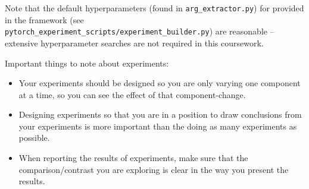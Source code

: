 \documentclass[11pt,]{article}
\begin{document}





Note that the default hyperparameters (found in \texttt{arg\_extractor.py}) for provided in the framework (see\\ \texttt{pytorch\_experiment\_scripts/experiment\_builder.py}) are reasonable -- extensive hyperparameter searches are  not required in this coursework. 

Important things to note about experiments:
\begin{itemize}
    \item Your experiments should be designed so you are only varying one component at a time, so you can see the effect of that component-change.
    \item Designing experiments so that you are in a position to draw conclusions from your experiments is more important than the doing as many experiments as possible.
    \item When reporting the results of experiments, make sure that the comparison/contrast you are exploring is clear in the way you present the results.
\end{itemize}
\end{document}
